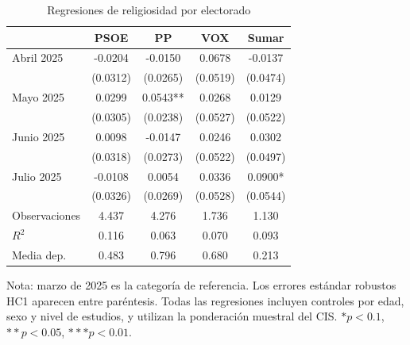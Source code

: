 \begin{table}[H]
\centering
\caption{Regresiones de religiosidad por electorado}
\label{tab:electorados-completa}
\small
\begin{tabular}{lcccc}
\hline
 & PSOE & PP & VOX & Sumar \\
\hline
Abril 2025 & -0.0204 & -0.0150 & 0.0678 & -0.0137 \\
 & (0.0312) & (0.0265) & (0.0519) & (0.0474) \\
Mayo 2025 & 0.0299 & 0.0543** & 0.0268 & 0.0129 \\
 & (0.0305) & (0.0238) & (0.0527) & (0.0522) \\
Junio 2025 & 0.0098 & -0.0147 & 0.0246 & 0.0302 \\
 & (0.0318) & (0.0273) & (0.0522) & (0.0497) \\
Julio 2025 & -0.0108 & 0.0054 & 0.0336 & 0.0900* \\
 & (0.0326) & (0.0269) & (0.0528) & (0.0544) \\
Observaciones & 4.437 & 4.276 & 1.736 & 1.130 \\
$R^2$ & 0.116 & 0.063 & 0.070 & 0.093 \\
Media dep. & 0.483 & 0.796 & 0.680 & 0.213 \\
\hline
\end{tabular}
\begin{flushleft}
\footnotesize Nota: marzo de 2025 es la categoría de referencia. Los errores estándar robustos HC1 aparecen entre paréntesis. Todas las regresiones incluyen controles por edad, sexo y nivel de estudios, y utilizan la ponderación muestral del CIS. $* p<0.1$, $** p<0.05$, $*** p<0.01$.
\end{flushleft}
\end{table}

